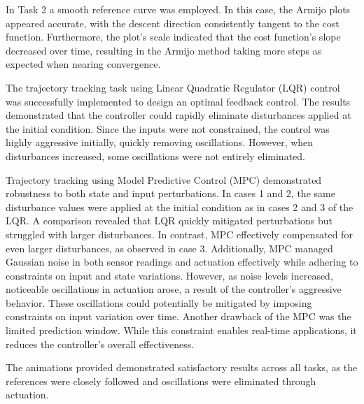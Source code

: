 In Task 2 a smooth reference curve was employed. In this case, the Armijo plots appeared accurate, with the descent direction consistently tangent to the cost function. Furthermore, the plot's scale indicated that the cost function's slope decreased over time, resulting in the Armijo method taking more steps as expected when nearing convergence.

The trajectory tracking task using Linear Quadratic Regulator (LQR) control was successfully implemented to design an optimal feedback control. The results demonstrated that the controller could rapidly eliminate disturbances applied at the initial condition. Since the inputs were not constrained, the control was highly aggressive initially, quickly removing oscillations. However, when disturbances increased, some oscillations were not entirely eliminated.

Trajectory tracking using Model Predictive Control (MPC) demonstrated robustness to both state and input perturbations. In cases 1 and 2, the same disturbance values were applied at the initial condition as in cases 2 and 3 of the LQR. A comparison revealed that LQR quickly mitigated perturbations but struggled with larger disturbances. In contrast, MPC effectively compensated for even larger disturbances, as observed in case 3. Additionally, MPC managed Gaussian noise in both sensor readings and actuation effectively while adhering to constraints on input and state variations. However, as noise levels increased, noticeable oscillations in actuation arose, a result of the controller's aggressive behavior. These oscillations could potentially be mitigated by imposing constraints on input variation over time. Another drawback of the MPC was the limited prediction window. While this constraint enables real-time applications, it reduces the controller's overall effectiveness.

The animations provided demonstrated satisfactory results across all tasks, as the references were closely followed and oscillations were eliminated through actuation.